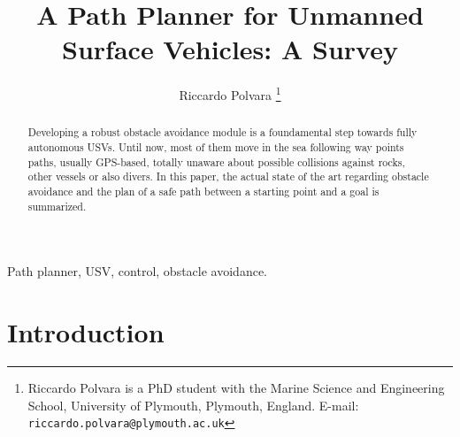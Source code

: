 \documentclass[journal]{IEEEtran}
\begin{document}
%
\title{A Path Planner for Unmanned Surface Vehicles: A Survey}
%
%
%

\author{Riccardo Polvara%
\thanks{Riccardo Polvara is a PhD student with the Marine Science and Engineering School, University of Plymouth, Plymouth, England.
      E-mail: {\tt riccardo.polvara@plymouth.ac.uk}}}




\maketitle


\begin{abstract}
Developing a robust obstacle avoidance module is a foundamental step towards fully autonomous USVs. Until now, most of them move in the sea following way points paths,
 usually GPS-based, totally unaware about possible collisions against rocks, other vessels or also divers. In this paper, the actual state of the art regarding obstacle avoidance
 and the plan of a safe path between a starting point and a goal is summarized.
\end{abstract}


\begin{IEEEkeywords}
Path planner, USV, control, obstacle avoidance.
\end{IEEEkeywords}



%



\section{Introduction} \label{introduction}
\end{document}
